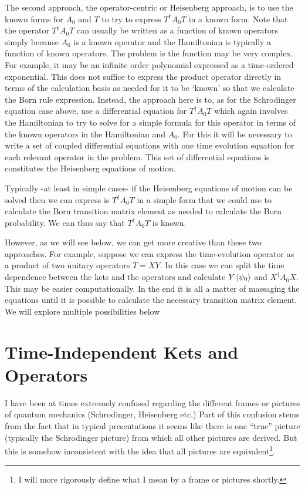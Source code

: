 \documentclass[12pt]{article}
\begin{document}
The second approach, the operator-centric or Heisenberg approach, is to use the known forms for $A_0$ and $T$ to try to express $T^{\dag} A_0 T$ in a known form. Note that the operator $T^{\dag}A_0 T$ can usually be written as a function of known operators simply because $A_0$ is a known operator and the Hamiltonian is typically a function of known operators. The problem is the function may be very complex. For example, it may be an infinite order polynomial expressed as a time-ordered exponential. This does not suffice to express the product operator directly in terms of the calculation basis as needed for it to be `known' so that we calculate the Born rule expression. Instead, the approach here is to, as for the Schrodinger equation case above, use a differential equation for $T^{\dag}A_0 T$ which again involves the Hamiltonian to try to solve for a simple formula for this operator in terms of the known operators in the Hamiltonian and $A_0$. For this it will be necessary to write a set of coupled differential equations with one time evolution equation for each relevant operator in the problem. This set of differential equations is constitutes the Heisenberg equations of motion.

Typically -at least in simple cases- if the Heisenberg equations of motion can be solved then we can express is $T^{\dag}A_0T$ in a simple form that we could use to calculate the Born transition matrix element as needed to calculate the Born probability. We can thus say that $T^{\dag}A_0T$ is known.

However, as we will see below, we can get more creative than these two approaches. For example, suppose we can express the time-evolution operator as a product of two unitary operators $T = XY$. In this case we can split the time dependence between the kets and the operators and calculate $Y\ket{\psi_0}$ and $X^{\dag}A_0X$. This may be easier computationally. In the end it is all a matter of massaging the equations until it is possible to calculate the necessary transition matrix element. We will explore multiple possibilities below


\section{Time-Independent Kets and Operators}


I have been at times extremely confused regarding the different frames or pictures of quantum mechanics (Schrodinger, Heisenberg etc.) Part of this confusion stems from the fact that in typical presentations it seems like there is one ``true'' picture (typically the Schrodinger picture) from which all other pictures are derived. But this is somehow inconsistent with the idea that all pictures are equivalent\footnote{I will more rigorously define what I mean by a frame or pictures shortly.}.
\end{document}

